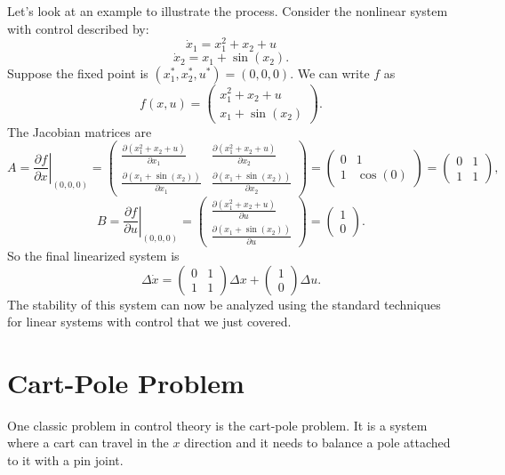 \documentclass[12pt]{article}
\newcommand{\dx}{\dot{x}}
\begin{document}
Let's look at an example to illustrate the process. Consider the nonlinear system with control described by:
$$\dx_1 = x_1^2 + x_2 + u$$ $$\dx_2 = x_1 + \sin(x_2).$$
Suppose the fixed point is $(x_1^*, x_2^*, u^*) = \left(0, 0, 0\right)$. We can write $f$ as
$$f(x, u) = \begin{pmatrix} x_1^2 + x_2 + u \\ x_1 + \sin(x_2) \end{pmatrix}.$$
The Jacobian matrices are
$$A = \left. \frac{\partial f}{\partial x} \right|_{(0, 0, 0)} = \begin{pmatrix} \frac{\partial (x_1^2 + x_2 + u)}{\partial x_1} & \frac{\partial (x_1^2 + x_2 + u)}{\partial x_2} \\ \frac{\partial (x_1 + \sin(x_2))}{\partial x_1} & \frac{\partial (x_1 + \sin(x_2))}{\partial x_2} \end{pmatrix} = \begin{pmatrix} 0 & 1 \\ 1 & \cos(0) \end{pmatrix} = \begin{pmatrix} 0 & 1 \\ 1 & 1 \end{pmatrix},$$
$$B = \left. \frac{\partial f}{\partial u} \right|_{(0, 0, 0)} = \begin{pmatrix} \frac{\partial (x_1^2 + x_2 + u)}{\partial u} \\ \frac{\partial (x_1 + \sin(x_2))}{\partial u} \end{pmatrix} = \begin{pmatrix} 1 \\ 0 \end{pmatrix}.$$ So the final linearized system is $$\Delta \dx = \begin{pmatrix} 0 & 1 \\ 1 & 1 \end{pmatrix}\Delta x + \begin{pmatrix} 1 \\ 0 \end{pmatrix}\Delta u.$$
The stability of this system can now be analyzed using the standard techniques for linear systems with control that we just covered.

\section{Cart-Pole Problem}

One classic problem in control theory is the cart-pole problem. It is a system where a cart can travel in the $x$ direction and it needs to balance a pole attached to it with a pin joint. \\
\end{document}
